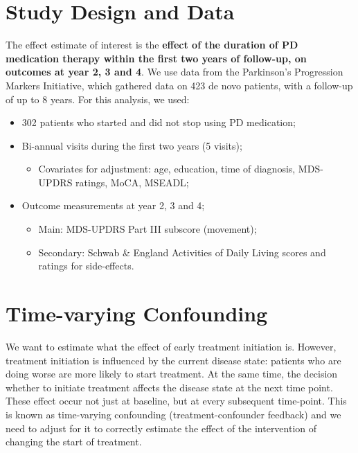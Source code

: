 \documentclass[a0,portrait]{a0poster}\usepackage[]{graphicx}\usepackage[svgnames]{xcolor}
\begin{document}
\begin{multicols}{2}
\section*{Study Design and Data}
The effect estimate of interest is the \textbf{effect of the duration of PD medication therapy within the first two years of follow-up, on outcomes at year 2, 3 and 4}. We use data from the Parkinson's Progression Markers Initiative, which gathered data on 423 de novo patients, with a follow-up of up to 8 years. For this analysis, we used:
\begin{itemize}
\item 302 patients who started and did not stop using PD medication;
\item Bi-annual visits during the first two years (5 visits);
\begin{itemize}
\item Covariates for adjustment: age, education, time of diagnosis, MDS-UPDRS ratings, MoCA, MSEADL;
\end{itemize}
\item Outcome measurements at year 2, 3 and 4;
\begin{itemize}
\item Main: MDS-UPDRS Part III subscore (movement);
\item Secondary: Schwab \& England Activities of Daily Living scores and ratings for side-effects.
\end{itemize}
\end{itemize}

\section*{Time-varying Confounding}
We want to estimate what the effect of early treatment initiation is. However, treatment initiation is influenced by the current disease state: patients who are doing worse are more likely to start treatment. At the same time, the decision whether to initiate treatment affects the disease state at the next time point. These effect occur not just at baseline, but at every subsequent time-point. This is known as time-varying confounding (treatment-confounder feedback) and we need to adjust for it to correctly estimate the effect of the intervention of changing the start of treatment.

\vspace{2cm}

\usetikzlibrary{positioning,shapes.geometric}


\end{multicols}
\end{document}
